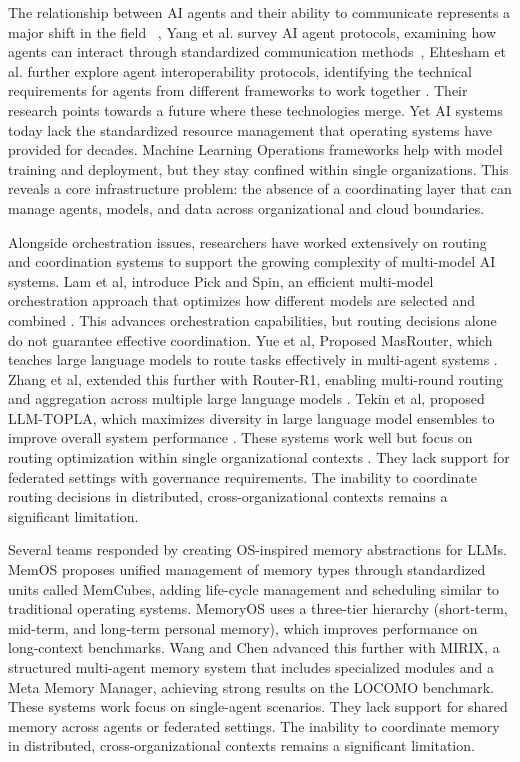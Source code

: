 \documentclass[final,5p,times,twocolumn,authoryear,draft]{elsarticle}
\begin{document}
The relationship between AI agents and their ability to communicate represents a major shift in the field ~\cite{b1}, Yang et al. survey AI agent protocols, examining how agents can interact through standardized communication methods~\cite{b2}, Ehtesham et al. further explore agent interoperability protocols, identifying the technical requirements for agents from different frameworks to work together \cite{b3}. Their research points towards a future where these technologies merge. Yet AI systems today lack the standardized resource management that operating systems have provided for decades. Machine Learning Operations frameworks help with model training and deployment, but they stay confined within single organizations.  This reveals a core infrastructure problem: the absence of a coordinating layer that can manage agents, models, and data across organizational and cloud boundaries. 

Alongside orchestration issues, researchers have worked extensively on routing and coordination systems to support the growing complexity of multi-model AI systems. Lam et al, introduce Pick and Spin, an efficient multi-model orchestration approach that optimizes how different models are selected and combined \cite{b4}. This advances orchestration capabilities, but routing decisions alone do not guarantee effective coordination. Yue et al, Proposed MasRouter, which teaches large language models to route tasks effectively in multi-agent systems \cite{b5}. Zhang et al, extended this further with Router-R1, enabling multi-round routing and aggregation across multiple large language models \cite{b6}. Tekin et al, proposed LLM-TOPLA, which maximizes diversity in large language model ensembles to improve overall system performance \cite{b7}. These systems work well but focus on routing optimization within single organizational contexts \cite{b3, b4, b5, b6}. They lack support for federated settings with governance requirements. The inability to coordinate routing decisions in distributed, cross-organizational contexts remains a significant limitation.

Several teams responded by creating OS-inspired memory abstractions for LLMs. MemOS  proposes unified management of memory types through standardized units called MemCubes, adding life-cycle management and scheduling similar to traditional operating systems. MemoryOS  uses a three-tier hierarchy (short-term, mid-term, and long-term personal memory), which improves performance on long-context benchmarks. Wang and Chen advanced this further with MIRIX, a structured multi-agent memory system that includes specialized modules and a Meta Memory Manager, achieving strong results on the LOCOMO benchmark. These systems work focus on single-agent scenarios. They lack support for shared memory across agents or federated settings. The inability to coordinate memory in distributed, cross-organizational contexts remains a significant limitation.
\end{document}
